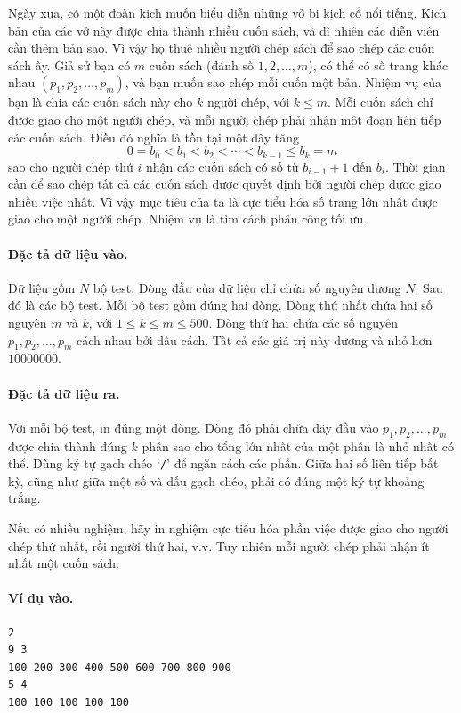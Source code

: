 \documentclass[11pt]{article}
\begin{document}
Ngày xưa, có một đoàn kịch muốn biểu diễn những vở bi kịch cổ nổi tiếng. Kịch
bản của các vở này được chia thành nhiều cuốn sách, và dĩ nhiên các diễn viên
cần thêm bản sao. Vì vậy họ thuê nhiều người chép sách để sao chép các cuốn
sách ấy. Giả sử bạn có $m$ cuốn sách (đánh số $1,2,\ldots,m$), có thể có số
trang khác nhau $(p_1,p_2,\ldots,p_m)$, và bạn muốn sao chép mỗi cuốn một bản.
Nhiệm vụ của bạn là chia các cuốn sách này cho $k$ người chép, với
$k\le m$. Mỗi cuốn sách chỉ được giao cho một người chép, và mỗi người chép
phải nhận một đoạn liên tiếp các cuốn sách. Điều đó nghĩa là tồn tại một dãy
tăng
\[
  0=b_0<b_1<b_2<\cdots<b_{k-1}\le b_k=m
\]
sao cho người chép thứ $i$ nhận các cuốn sách có số từ $b_{i-1}+1$ đến
$b_i$. Thời gian cần để sao chép tất cả các cuốn sách được quyết định bởi
người chép được giao nhiều việc nhất. Vì vậy mục tiêu của ta là cực tiểu hóa
số trang lớn nhất được giao cho một người chép. Nhiệm vụ là tìm cách phân
công tối ưu.

\paragraph{Đặc tả dữ liệu vào.}
Dữ liệu gồm $N$ bộ test. Dòng đầu của dữ liệu chỉ chứa số nguyên dương $N$.
Sau đó là các bộ test. Mỗi bộ test gồm đúng hai dòng. Dòng thứ nhất chứa hai
số nguyên $m$ và $k$, với $1\le k\le m\le 500$. Dòng thứ hai chứa các số
nguyên $p_1,p_2,\ldots,p_m$ cách nhau bởi dấu cách. Tất cả các giá trị này
dương và nhỏ hơn $10000000$.

\paragraph{Đặc tả dữ liệu ra.}
Với mỗi bộ test, in đúng một dòng. Dòng đó phải chứa dãy đầu vào
$p_1,p_2,\ldots,p_m$ được chia thành đúng $k$ phần sao cho tổng lớn nhất của
một phần là nhỏ nhất có thể. Dùng ký tự gạch chéo `\texttt{/}' để ngăn cách
các phần. Giữa hai số liên tiếp bất kỳ, cũng như giữa một số và dấu gạch
chéo, phải có đúng một ký tự khoảng trắng.

Nếu có nhiều nghiệm, hãy in nghiệm cực tiểu hóa phần việc được giao cho người
chép thứ nhất, rồi người thứ hai, v.v. Tuy nhiên mỗi người chép phải nhận ít
nhất một cuốn sách.

\paragraph{Ví dụ vào.}
\begin{verbatim}
2
9 3
100 200 300 400 500 600 700 800 900
5 4
100 100 100 100 100
\end{verbatim}
\end{document}
